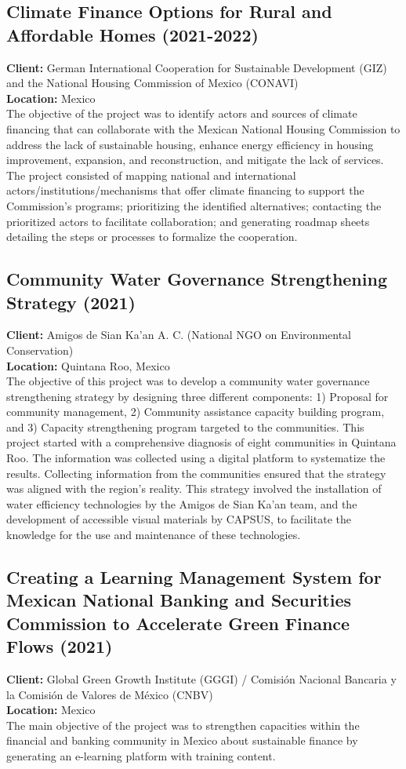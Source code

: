 \documentclass[
	a4paper,
	12pt,
	unnumberedsections,
]{CSSullivanBusinessReport}
\begin{document}
\subsection{Climate Finance Options for Rural and Affordable Homes (2021-2022)}
\textbf{Client:}  German International Cooperation for Sustainable Development (GIZ) and the National Housing Commission of Mexico (CONAVI) \\
\textbf{Location:}  Mexico  \\[0.5em]
 The objective of the project was to identify actors and sources of climate financing that can collaborate with the Mexican National Housing Commission to address the lack of sustainable housing, enhance energy efficiency in housing improvement, expansion, and reconstruction, and mitigate the lack of services. The project consisted of mapping national and international actors/institutions/mechanisms that offer climate financing to support the Commission’s programs; prioritizing the identified alternatives; contacting the prioritized actors to facilitate collaboration; and generating roadmap sheets detailing the steps or processes to formalize the cooperation.

\subsection{Community Water Governance Strengthening Strategy (2021)}
\textbf{Client:}  Amigos de Sian Ka’an A. C. (National NGO on Environmental Conservation) \\
\textbf{Location:}  Quintana Roo, Mexico   \\[0.5em]
 The objective of this project was to develop a community water governance strengthening strategy by designing three different components: 1) Proposal for community management, 2) Community assistance capacity building program, and 3) Capacity strengthening program targeted to the communities. This project started with a comprehensive diagnosis of eight communities in Quintana Roo. The information was collected using a digital platform to systematize the results. Collecting information from the communities ensured that the strategy was aligned with the region’s reality. This strategy involved the installation of water efficiency technologies by the Amigos de Sian Ka’an team, and the development of accessible visual materials by CAPSUS, to facilitate the knowledge for the use and maintenance of these technologies.

\subsection{Creating a Learning Management System for Mexican National Banking and Securities Commission to Accelerate Green Finance Flows (2021)}
\textbf{Client:}  Global Green Growth Institute (GGGI) / Comisión Nacional Bancaria y la Comisión de Valores de México (CNBV) \\
\textbf{Location:}  Mexico   \\[0.5em]
 The main objective of the project was to strengthen capacities within the financial and banking community in Mexico about sustainable finance by generating an e-learning platform with training content.
\end{document}
